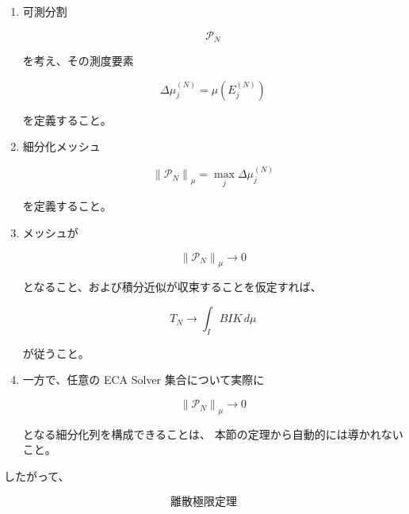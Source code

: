 \documentclass[a4paper,11pt]{article}
\begin{document}
\begin{enumerate}

    \item
    可測分割

    \begin{equation}
        \mathcal{P}_N
    \end{equation}

    を考え、その測度要素

    \begin{equation}
        \Delta\mu_j^{(N)}
        =
        \mu(E_j^{(N)})
    \end{equation}

    を定義すること。

    \item
    細分化メッシュ

    \begin{equation}
        \left\|
        \mathcal{P}_N
        \right\|_\mu
        =
        \max_j
        \Delta\mu_j^{(N)}
    \end{equation}

    を定義すること。

    \item
    メッシュが

    \begin{equation}
        \left\|
        \mathcal{P}_N
        \right\|_\mu
        \to0
    \end{equation}

    となること、および積分近似が収束することを仮定すれば、

    \begin{equation}
        T_N
        \to
        \int_I BIK\,d\mu
    \end{equation}

    が従うこと。

    \item
    一方で、任意の ECA Solver 集合について実際に

    \begin{equation}
        \left\|
        \mathcal{P}_N
        \right\|_\mu
        \to0
    \end{equation}

    となる細分化列を構成できることは、
    本節の定理から自動的には導かれないこと。

\end{enumerate}

したがって、

\begin{equation}
    \boxed{
        \text{離散極限定理}
    }
\end{equation}
\end{document}
